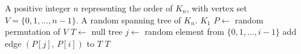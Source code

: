 
\begin{algorithmic}[1]
\Require A positive integer $n$ representing the order of $K_n$, with
  vertex set $V = \{0, 1, \dots, n-1\}$.
\Ensure A random spanning tree of $K_n$.
  \State \Return $K_1$
\EndIf
\State $P \gets$ random permutation of $V$
\State $T \gets$ null tree
  \State $j \gets$ random element from $\{0, 1, \dots, i-1\}$
  \State add edge $(P[j],\, P[i])$ to $T$
\EndFor
\State \Return $T$
\end{algorithmic}
